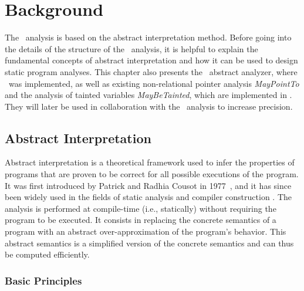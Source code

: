 \chapter{Background}\label{chapter:background}

The \cpo\ analysis is based on the abstract interpretation method.
Before going into the details of the structure of the \cpo\ analysis,
it is helpful to explain the fundamental concepts of abstract interpretation and how it can be used to design static program analyses.
This chapter also presents the \goblint\ abstract analyzer, where \cpo\ was implemented, as well as existing non-relational pointer analysis \emph{MayPointTo} and the analysis of tainted variables \emph{MayBeTainted}, which are implemented in \goblint.
They will later be used in collaboration with the \cpo\ analysis to increase precision.

\section{Abstract Interpretation}

Abstract interpretation is a theoretical framework used to infer the properties of programs that are proven to be correct for all possible executions of the program.
It was first introduced by Patrick and Radhia Cousot in 1977~\cite{ai,aibook}, and it has since been widely used in the fields of static analysis \cite{ai-static-analysis} and compiler construction \cite{ai-compiler-design}.
The analysis is performed at compile-time (i.e., statically) without requiring the program to be executed.
It consists in replacing the concrete
semantics of a program with an abstract over-approximation of the program's behavior.
This abstract semantics is a simplified version of the concrete semantics
and can thus be computed efficiently.

\subsection{Basic Principles}


